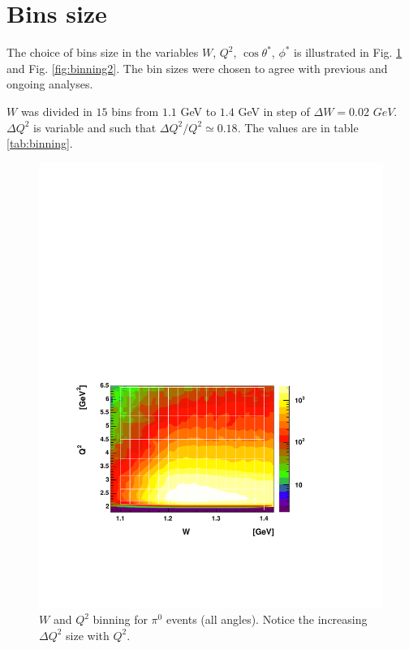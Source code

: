 \section{Bins size}
\label{sec:binning}
The choice of bins size in the variables $W$, $Q^2$, $\cos\theta^*$, $\phi^*$
is illustrated in Fig. \ref{fig:binning1} and Fig. \ref{fig:binning2}.
The bin sizes were chosen to agree with previous and ongoing analyses.


$W$ was divided in $15$ bins from $1.1$ GeV to $1.4$ GeV in step of
$\Delta W = 0.02$ $GeV$. $\Delta Q^2$ is variable and such that $\Delta Q^2/Q^2\simeq 0.18$. 
The values are in table \ref{tab:binning}.

\begin{figure}[h]
 \begin{center}
  \includegraphics[width=12cm, bb=40 140 520 460]{analysis/img/binning1}
  \caption[$W$ and $Q^2$ binning for $\pi^0$ events]
          { $W$ and $Q^2$ binning for $\pi^0$ events (all angles). Notice the increasing $\Delta Q^2$ size with $Q^2$.}
 \label{fig:binning1}
  \end{center} 
\end{figure} 


